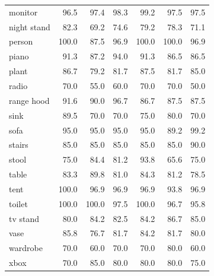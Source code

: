 {\begin{longtable}{lrrrrrr}
monitor & 96.5 & 97.4 & 98.3 & 99.2 & 97.5 & 97.5 \\
night stand & 82.3 & 69.2 & 74.6 & 79.2 & 78.3 & 71.1 \\
person & 100.0 & 87.5 & 96.9 & 100.0 & 100.0 & 96.9 \\
piano & 91.3 & 87.2 & 94.0 & 91.3 & 86.5 & 86.5 \\
plant & 86.7 & 79.2 & 81.7 & 87.5 & 81.7 & 85.0 \\
radio & 70.0 & 55.0 & 60.0 & 70.0 & 70.0 & 50.0 \\
range hood & 91.6 & 90.0 & 96.7 & 86.7 & 87.5 & 87.5 \\
sink & 89.5 & 70.0 & 70.0 & 75.0 & 80.0 & 70.0 \\
sofa & 95.0 & 95.0 & 95.0 & 95.0 & 89.2 & 99.2 \\
stairs & 85.0 & 85.0 & 85.0 & 85.0 & 85.0 & 90.0 \\
stool & 75.0 & 84.4 & 81.2 & 93.8 & 65.6 & 75.0 \\
table & 83.3 & 89.8 & 81.0 & 84.3 & 81.2 & 78.5 \\
tent & 100.0 & 96.9 & 96.9 & 96.9 & 93.8 & 96.9 \\
toilet & 100.0 & 100.0 & 97.5 & 100.0 & 96.7 & 95.8 \\
tv stand & 80.0 & 84.2 & 82.5 & 84.2 & 86.7 & 85.0 \\
vase & 85.8 & 76.7 & 81.7 & 84.2 & 81.7 & 80.0 \\
wardrobe & 70.0 & 60.0 & 70.0 & 70.0 & 80.0 & 60.0 \\
xbox & 70.0 & 85.0 & 80.0 & 80.0 & 80.0 & 75.0 \\
\end{longtable}}
